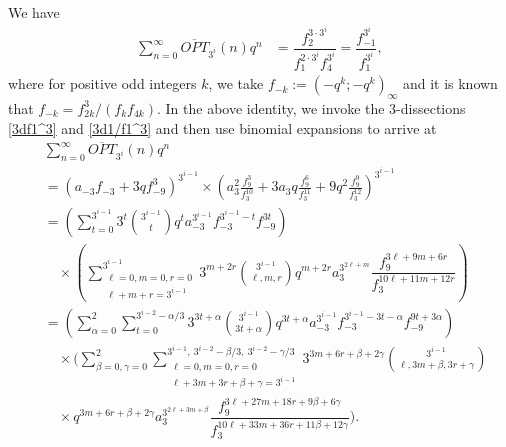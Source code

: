 \documentclass[12pt,reqno]{amsart}
\numberwithin{equation}{section}
\begin{document}

    We have
    \begin{align*}
        \sum_{n=0}^\infty \overline{OPT}_{3^i}(n)q^n&=\dfrac{f_2^{3\cdot 3^i}}{f_1^{2\cdot 3^i}f_4^{3^i}}=\dfrac{f_{-1}^{3^i}}{f_1^{3^i}},
    \end{align*}
    where for positive odd integers $k$, we take $f_{-k}:=\left(-q^k;-q^k\right)_\infty$ and it is known that $f_{-k}=f_{2k}^3/\left(f_kf_{4k}\right)$. In the above identity, we invoke the 3-dissections \eqref{3df1^3} and \eqref{3d1/f1^3} and then use binomial expansions to arrive at
    \begin{align*}
        &\sum_{n=0}^\infty \overline{OPT}_{3^i}(n)q^n\\
        &=\left(a_{-3}f_{-3}+3q f_{-9}^3\right)^{3^{i-1}}\times\left(a_3^2\frac{f_9^3}{f_3^{10}}+3 a_3 q \frac{f_9^6}{f_3^{11}}+9 q^2\frac{f_9^9}{f_3^{12}}\right)^{3^{i-1}}\\
        &=\left(\sum_{t=0}^{3^{i-1}}3^t\binom{3^{i-1}}{t}q^ta_{-3}^{3^{i-1}}f_{-3}^{3^{i-1}-t}f_{-9}^{3t}\right)\\&\quad \times \left(\sum_{\substack{\ell=0,m=0,r=0\\ \ell+m+r=3^{i-1}}}^{3^{i-1}}3^{m+2r}\binom{3^{i-1}}{\ell,m,r}q^{m+2r}a_{3}^{3^{2\ell+m}}\dfrac{f_9^{3\ell+9m+6r}}{f_3^{10\ell+11m+12r}}\right)\\
        &=\left(\sum_{\alpha=0}^{2}\sum_{t=0}^{3^{i-2}-\alpha/3}3^{3t+\alpha}\binom{3^{i-1}}{3t+\alpha}q^{3t+\alpha}a_{-3}^{3^{i-1}}f_{-3}^{3^{i-1}-3t-\alpha}f_{-9}^{9t+3\alpha}\right) \\
        & \quad \times \Bigg(\sum_{\beta=0,\gamma=0}^{2}\sum_{\substack{\ell=0,m=0,r=0\\ \ell+3m+3r+\beta+\gamma=3^{i-1}}}^{3^{i-1},~ 3^{i-2}-\beta/3,~ 3^{i-2}-\gamma/3} 3^{3m+6r+\beta+2\gamma}\binom{3^{i-1}}{\ell,3m+\beta,3r+\gamma}\\
        &\quad 
        \times q^{3m+6r+\beta+2\gamma} a_{3}^{3^{2\ell+3m+\beta}} \dfrac{f_9^{3\ell+27m+18r+9\beta+6\gamma}}{f_3^{10\ell+33m+36r+11\beta+12\gamma}}\Bigg).
    \end{align*}
\end{document}
